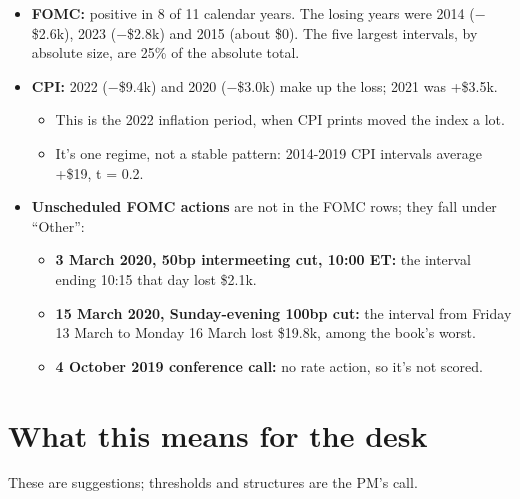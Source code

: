 \documentclass{article}
\begin{document}
\begin{itemize}

\item \textbf{FOMC:} positive in 8 of 11 calendar years. The losing years were 2014 (\ensuremath{-}\$2.6k), 2023 (\ensuremath{-}\$2.8k) and 2015 (about \$0). The five largest intervals, by absolute size, are 25\% of the absolute total.

\item \textbf{CPI:} 2022 (\ensuremath{-}\$9.4k) and 2020 (\ensuremath{-}\$3.0k) make up the loss; 2021 was +\$3.5k.

\begin{itemize}

\item This is the 2022 inflation period, when CPI prints moved the index a lot.

\item It's one regime, not a stable pattern: 2014-2019 CPI intervals average +\$19, t = 0.2.

\end{itemize}

\item \textbf{Unscheduled FOMC actions} are not in the FOMC rows; they fall under ``Other'':

\begin{itemize}

\item \textbf{3 March 2020, 50bp intermeeting cut, 10:00 ET:} the interval ending 10:15 that day lost \$2.1k.

\item \textbf{15 March 2020, Sunday-evening 100bp cut:} the interval from Friday 13 March to Monday 16 March lost \$19.8k, among the book's worst.

\item \textbf{4 October 2019 conference call:} no rate action, so it's not scored.

\end{itemize}

\end{itemize}

\section{What this means for the desk}

These are suggestions; thresholds and structures are the PM's call.
\end{document}
